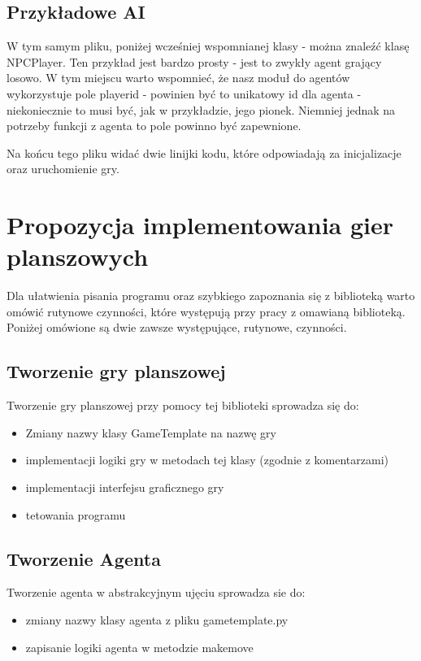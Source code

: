 \documentclass[polish,shortabstract,inz]{iithesis}
\begin{document}
\subsection{Przykładowe AI}
W tym samym pliku, poniżej wcześniej wspomnianej klasy - można znaleźć klasę NPCPlayer. Ten przykład jest bardzo prosty - jest to zwykły agent grający losowo.
W tym miejscu warto wspomnieć, że nasz moduł do agentów wykorzystuje pole player\textunderscore id - powinien być to unikatowy id dla agenta - niekoniecznie to musi być, jak w przykładzie, jego pionek.
Niemniej jednak na potrzeby funkcji z agenta to pole powinno być zapewnione.

Na końcu tego pliku widać dwie linijki kodu, które odpowiadają za inicjalizacje oraz uruchomienie gry.
\section{Propozycja implementowania gier planszowych}
Dla ułatwienia pisania programu oraz szybkiego zapoznania się z biblioteką warto omówić rutynowe czynności, które występują przy pracy z omawianą biblioteką.
Poniżej omówione są dwie zawsze występujące, rutynowe, czynności.
\subsection{Tworzenie gry planszowej}
Tworzenie gry planszowej przy pomocy tej biblioteki sprowadza się do:
\begin{itemize}
  \item Zmiany nazwy klasy GameTemplate na nazwę gry
  \item implementacji logiki gry w metodach tej klasy (zgodnie z komentarzami)
  \item implementacji interfejsu graficznego gry
  \item tetowania programu
\end{itemize}

\subsection{Tworzenie Agenta}
Tworzenie agenta w abstrakcyjnym ujęciu sprowadza sie do:
\begin{itemize}
  \item zmiany nazwy klasy agenta z pliku game\textunderscore template.py
  \item zapisanie logiki agenta w metodzie make\textunderscore move
\end{itemize}
\end{document}
